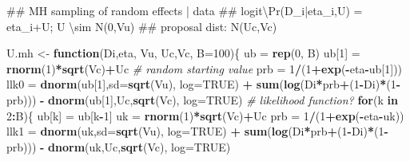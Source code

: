 \documentclass[]{book}
\newenvironment{Shaded}{\begin{snugshade}}{\end{snugshade}}
\newcommand{\KeywordTok}[1]{\textcolor[rgb]{0.13,0.29,0.53}{\textbf{#1}}}
\newcommand{\DataTypeTok}[1]{\textcolor[rgb]{0.13,0.29,0.53}{#1}}
\newcommand{\DecValTok}[1]{\textcolor[rgb]{0.00,0.00,0.81}{#1}}
\newcommand{\StringTok}[1]{\textcolor[rgb]{0.31,0.60,0.02}{#1}}
\newcommand{\CommentTok}[1]{\textcolor[rgb]{0.56,0.35,0.01}{\textit{#1}}}
\newcommand{\OtherTok}[1]{\textcolor[rgb]{0.56,0.35,0.01}{#1}}
\newcommand{\ControlFlowTok}[1]{\textcolor[rgb]{0.13,0.29,0.53}{\textbf{#1}}}
\newcommand{\OperatorTok}[1]{\textcolor[rgb]{0.81,0.36,0.00}{\textbf{#1}}}
\newcommand{\NormalTok}[1]{#1}
\begin{document}
\begin{Shaded}
\begin{Highlighting}[]
\NormalTok{## MH sampling of random effects | data}
\NormalTok{## logit\textbackslash{}Pr(D_i|eta_i,U) = eta_i+U; U \textbackslash{}sim N(0,Vu)}
\NormalTok{## proposal dist: N(Uc,Vc)}

\NormalTok{U.mh <-}\StringTok{ }\ControlFlowTok{function}\NormalTok{(Di,eta, Vu, Uc,Vc, }\DataTypeTok{B=}\DecValTok{100}\NormalTok{)\{}
\NormalTok{  ub =}\StringTok{ }\KeywordTok{rep}\NormalTok{(}\DecValTok{0}\NormalTok{, B)}
\NormalTok{  ub[}\DecValTok{1}\NormalTok{] =}\StringTok{ }\KeywordTok{rnorm}\NormalTok{(}\DecValTok{1}\NormalTok{)}\OperatorTok{*}\KeywordTok{sqrt}\NormalTok{(Vc)}\OperatorTok{+}\NormalTok{Uc }\CommentTok{# random starting value}
\NormalTok{  prb =}\StringTok{ }\DecValTok{1}\OperatorTok{/}\NormalTok{(}\DecValTok{1}\OperatorTok{+}\KeywordTok{exp}\NormalTok{(}\OperatorTok{-}\NormalTok{eta}\OperatorTok{-}\NormalTok{ub[}\DecValTok{1}\NormalTok{]))}
\NormalTok{  llk0 =}\StringTok{ }\KeywordTok{dnorm}\NormalTok{(ub[}\DecValTok{1}\NormalTok{],}\DataTypeTok{sd=}\KeywordTok{sqrt}\NormalTok{(Vu), }\DataTypeTok{log=}\OtherTok{TRUE}\NormalTok{) }\OperatorTok{+}\StringTok{ }\KeywordTok{sum}\NormalTok{(}\KeywordTok{log}\NormalTok{(Di}\OperatorTok{*}\NormalTok{prb}\OperatorTok{+}\NormalTok{(}\DecValTok{1}\OperatorTok{-}\NormalTok{Di)}\OperatorTok{*}\NormalTok{(}\DecValTok{1}\OperatorTok{-}\NormalTok{prb))) }\OperatorTok{-}\StringTok{ }\KeywordTok{dnorm}\NormalTok{(ub[}\DecValTok{1}\NormalTok{],Uc,}\KeywordTok{sqrt}\NormalTok{(Vc), }\DataTypeTok{log=}\OtherTok{TRUE}\NormalTok{) }\CommentTok{# likelihood function? }
  \ControlFlowTok{for}\NormalTok{(k }\ControlFlowTok{in} \DecValTok{2}\OperatorTok{:}\NormalTok{B)\{}
\NormalTok{    ub[k] =}\StringTok{ }\NormalTok{ub[k}\OperatorTok{-}\DecValTok{1}\NormalTok{]}
\NormalTok{    uk =}\StringTok{ }\KeywordTok{rnorm}\NormalTok{(}\DecValTok{1}\NormalTok{)}\OperatorTok{*}\KeywordTok{sqrt}\NormalTok{(Vc)}\OperatorTok{+}\NormalTok{Uc}
\NormalTok{    prb =}\StringTok{ }\DecValTok{1}\OperatorTok{/}\NormalTok{(}\DecValTok{1}\OperatorTok{+}\KeywordTok{exp}\NormalTok{(}\OperatorTok{-}\NormalTok{eta}\OperatorTok{-}\NormalTok{uk))}
\NormalTok{    llk1 =}\StringTok{ }\KeywordTok{dnorm}\NormalTok{(uk,}\DataTypeTok{sd=}\KeywordTok{sqrt}\NormalTok{(Vu), }\DataTypeTok{log=}\OtherTok{TRUE}\NormalTok{) }\OperatorTok{+}\StringTok{ }\KeywordTok{sum}\NormalTok{(}\KeywordTok{log}\NormalTok{(Di}\OperatorTok{*}\NormalTok{prb}\OperatorTok{+}\NormalTok{(}\DecValTok{1}\OperatorTok{-}\NormalTok{Di)}\OperatorTok{*}\NormalTok{(}\DecValTok{1}\OperatorTok{-}\NormalTok{prb))) }\OperatorTok{-}\StringTok{ }\KeywordTok{dnorm}\NormalTok{(uk,Uc,}\KeywordTok{sqrt}\NormalTok{(Vc), }\DataTypeTok{log=}\OtherTok{TRUE}\NormalTok{)}

\end{Highlighting}
\end{Shaded}
\end{document}
